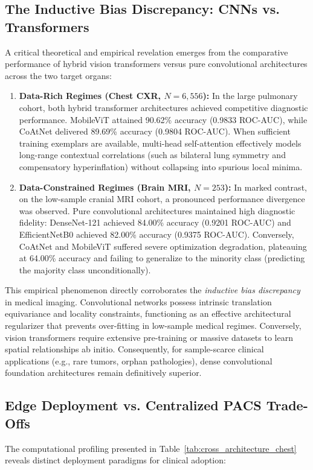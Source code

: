 \documentclass[journal]{IEEEtran}
\begin{document}
\subsection{The Inductive Bias Discrepancy: CNNs vs. Transformers}
A critical theoretical and empirical revelation emerges from the comparative performance of hybrid vision transformers versus pure convolutional architectures across the two target organs:

\begin{enumerate}
    \item \textbf{Data-Rich Regimes (Chest CXR, $N=6,556$):} In the large pulmonary cohort, both hybrid transformer architectures achieved competitive diagnostic performance. MobileViT attained 90.62\% accuracy (0.9833 ROC-AUC), while CoAtNet delivered 89.69\% accuracy (0.9804 ROC-AUC). When sufficient training exemplars are available, multi-head self-attention effectively models long-range contextual correlations (such as bilateral lung symmetry and compensatory hyperinflation) without collapsing into spurious local minima.
    \item \textbf{Data-Constrained Regimes (Brain MRI, $N=253$):} In marked contrast, on the low-sample cranial MRI cohort, a pronounced performance divergence was observed. Pure convolutional architectures maintained high diagnostic fidelity: DenseNet-121 achieved 84.00\% accuracy (0.9201 ROC-AUC) and EfficientNetB0 achieved 82.00\% accuracy (0.9375 ROC-AUC). Conversely, CoAtNet and MobileViT suffered severe optimization degradation, plateauing at 64.00\% accuracy and failing to generalize to the minority class (predicting the majority class unconditionally).
\end{enumerate}

This empirical phenomenon directly corroborates the \textit{inductive bias discrepancy} in medical imaging. Convolutional networks possess intrinsic translation equivariance and locality constraints, functioning as an effective architectural regularizer that prevents over-fitting in low-sample medical regimes. Conversely, vision transformers require extensive pre-training or massive datasets to learn spatial relationships ab initio. Consequently, for sample-scarce clinical applications (e.g., rare tumors, orphan pathologies), dense convolutional foundation architectures remain definitively superior.

\subsection{Edge Deployment vs. Centralized PACS Trade-Offs}
The computational profiling presented in Table~\ref{tab:cross_architecture_chest} reveals distinct deployment paradigms for clinical adoption:
\end{document}
